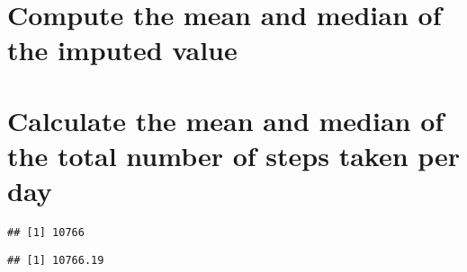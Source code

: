 \documentclass[
]{article}
\newenvironment{Shaded}{\begin{snugshade}}{\end{snugshade}}
\newcommand{\ControlFlowTok}[1]{\textcolor[rgb]{0.13,0.29,0.53}{\textbf{#1}}}
\newcommand{\KeywordTok}[1]{\textcolor[rgb]{0.13,0.29,0.53}{\textbf{#1}}}
\newcommand{\NormalTok}[1]{#1}
\newcommand{\OperatorTok}[1]{\textcolor[rgb]{0.81,0.36,0.00}{\textbf{#1}}}
\newcommand{\StringTok}[1]{\textcolor[rgb]{0.31,0.60,0.02}{#1}}
\begin{document}
\hypertarget{compute-the-mean-and-median-of-the-imputed-value}{%
\section{Compute the mean and median of the imputed
value}\label{compute-the-mean-and-median-of-the-imputed-value}}

\hypertarget{calculate-the-mean-and-median-of-the-total-number-of-steps-taken-per-day-1}{%
\section{Calculate the mean and median of the total number of steps
taken per
day}\label{calculate-the-mean-and-median-of-the-total-number-of-steps-taken-per-day-1}}

\begin{Shaded}
\end{Shaded}

\begin{verbatim}
## [1] 10766
\end{verbatim}

\begin{Shaded}
\end{Shaded}

\begin{verbatim}
## [1] 10766.19
\end{verbatim}

\begin{Shaded}
\end{Shaded}
\end{document}
